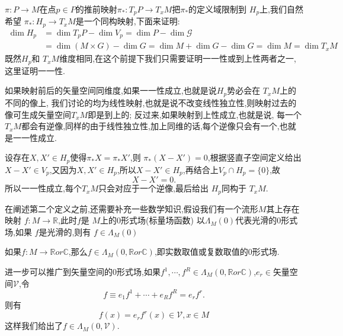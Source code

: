 \documentclass[../main.tex]{subfiles}
\begin{document}
  $\pi: P \to M$在点$p \in P$的推前映射$\pi_* : T_pP \to T_xM$把$\pi_*$的定义域限制到 $H_p$上,我们自然希望 $\pi_*: H_p \to T_xM$是一个同构映射,下面来证明:
  \begin{align*}
    \dim H_p &= \dim T_pP - \dim V_p = \dim P - \dim \mathscr{G} \\&=  \dim(M \times G) - \dim{G} = \dim{M} + \dim{G} -\dim G = \dim M = \dim T_xM
  \end{align*}
  既然$H_p$和 $T_xM$维度相同,在这个前提下我们只需要证明一一性或到上性两者之一,这里证明一一性.
   \begin{note}
   如果映射前后的矢量空间同维度,如果一一性成立,也就是说$H_p$势必会在 $T_xM$上的不同的像上, 我们讨论的均为线性映射,也就是说不改变线性独立性,则映射过去的像可生成矢量空间$T_xM$即是到上的;
   反过来,如果映射到上性成立,也就是说, 每一个$T_xM$都会有逆像,同样的由于线性独立性,加上同维的话,每个逆像只会有一个,也就是一一性成立.
  \end{note}
  设存在$X,X' \in H_p$使得$\pi_* X = \pi_* X'$,则 $\pi_*(X - X') = 0$,根据竖直子空间定义给出$X - X' \in V_p$,又因为$X,X' \in H_p$,所以$X - X' \in  H_p$,再结合上$V_p \cap H_p = \{0\}$,故
  \[
 X - X' = 0 
  .\] 
  所以一一性成立,每个$T_xM$只会对应于一个逆像,最后给出 $H_p$同构于 $T_xM$.

  在阐述第二个定义之前,还需要补充一些数学知识,假设我们有一个流形$M$其上存在映射 $f:M\to \mathbb{R}$,此时$f$是 $M$上的0形式场(标量场函数)
以$\Lambda_M(0)$代表光滑的0形式场,如果 $f$是光滑的,则有 $f \in \Lambda_M(0)$
\begin{note}
  如果$f:M \to \mathbb{R} or \mathbb{C}$,那么$f \in \Lambda_M(0,\mathbb{R} or \mathbb{C})$,即实数取值或复数取值的0形式场.
\end{note}
进一步可以推广到矢量空间的0形式场,如果$f^1 ,\cdots ,f^R \in \Lambda_M(0,\mathbb{R} or \mathbb{C})$,$e_r \in$矢量空间$\mathscr{V}$,令\[
f \equiv e_1f^1 +\cdots + e_R f^R = e_r f^r
.\] 
则有\[f(x) = e_rf^r(x) \in \mathscr{V},x\in M\]
这样我们给出了$f \in \Lambda_M(0,\mathscr{V})$.
\end{document}
